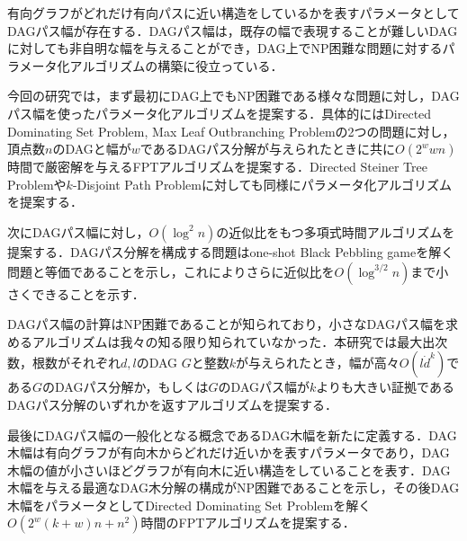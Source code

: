 \documentclass[master]{kuisthesis}		%
\theoremstyle{plain}
\theoremstyle{definition}
\begin{document}
\begin{jabstract}
有向グラフがどれだけ有向パスに近い構造をしているかを表すパラメータとしてDAGパス幅が存在する．DAGパス幅は，既存の幅で表現することが難しいDAGに対しても非自明な幅を与えることができ，DAG上でNP困難な問題に対するパラメータ化アルゴリズムの構築に役立っている．


今回の研究では，まず最初にDAG上でもNP困難である様々な問題に対し，DAGパス幅を使ったパラメータ化アルゴリズムを提案する．具体的にはDirected Dominating Set Problem, Max Leaf Outbranching Problemの2つの問題に対し，頂点数$n$のDAGと幅が$w$であるDAGパス分解が与えられたときに共に$O(2^wwn)$時間で厳密解を与えるFPTアルゴリズムを提案する．Directed Steiner Tree Problemや$k$-Disjoint Path Problemに対しても同様にパラメータ化アルゴリズムを提案する．


次にDAGパス幅に対し，$O(\log^2 n)$の近似比をもつ多項式時間アルゴリズムを提案する．DAGパス分解を構成する問題はone-shot Black Pebbling gameを解く問題と等価であることを示し，これによりさらに近似比を$O(\log^{3/2} n)$まで小さくできることを示す．

DAGパス幅の計算はNP困難であることが知られており，小さなDAGパス幅を求めるアルゴリズムは我々の知る限り知られていなかった．本研究では最大出次数，根数がそれぞれ$d, l$のDAG $G$と整数$k$が与えられたとき，幅が高々$O(l\dot d^k)$である$G$のDAGパス分解か，もしくは$G$のDAGパス幅が$k$よりも大きい証拠であるDAGパス分解のいずれかを返すアルゴリズムを提案する．


最後にDAGパス幅の一般化となる概念であるDAG木幅を新たに定義する．DAG木幅は有向グラフが有向木からどれだけ近いかを表すパラメータであり，DAG木幅の値が小さいほどグラフが有向木に近い構造をしていることを表す．DAG木幅を与える最適なDAG木分解の構成がNP困難であることを示し，その後DAG木幅をパラメータとしてDirected Dominating Set Problemを解く$O(2^w(k+w)n+n^2)$時間のFPTアルゴリズムを提案する．

\end{jabstract}
\end{document}
